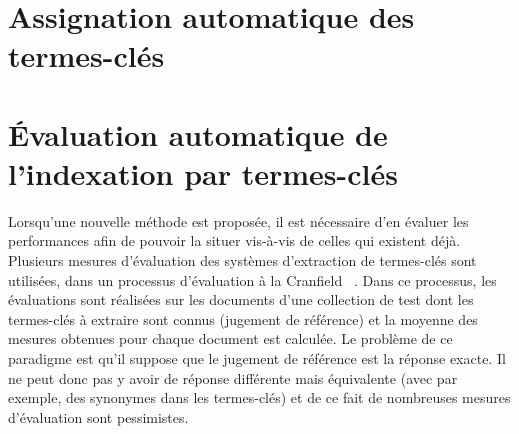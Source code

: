   \section{Assignation automatique des termes-clés}
  \label{sec:main-state_of_the_art-automatic_keyphrase_assignment}


  \section{Évaluation automatique de l'indexation par termes-clés}
  \label{sec:main-state_of_the_art-automatic_evaluation_of_keyphrase_annotation}
    Lorsqu'une nouvelle méthode est proposée, il est nécessaire d'en évaluer
    les performances afin de pouvoir la situer vis-à-vis de celles qui
    existent déjà. Plusieurs mesures d'évaluation des systèmes d'extraction de
    termes-clés sont utilisées, dans un processus d'évaluation \og à la
    Cranfield \fg \ \citep{voorhees2002philosophy}. Dans ce processus, les
    évaluations sont réalisées sur les documents d'une collection de test dont
    les termes-clés à extraire sont connus (jugement de référence) et la
    moyenne des mesures obtenues pour chaque document est calculée. Le
    problème de ce paradigme est qu'il suppose que le jugement de référence
    est la réponse exacte. Il ne peut donc pas y avoir de réponse différente
    mais équivalente (avec par exemple, des synonymes dans les termes-clés) et
    de ce fait de nombreuses mesures d'évaluation sont pessimistes.
      

